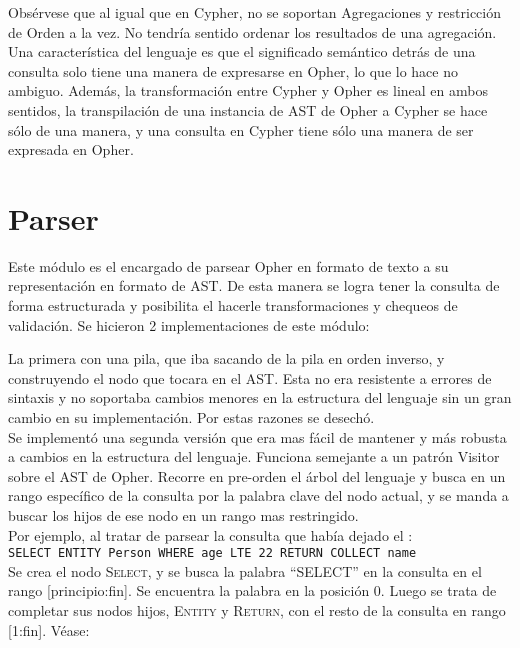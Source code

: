 Obs\'ervese que al igual que en Cypher, no se soportan Agregaciones y restricci\'on de Orden a la vez. No tendr\'ia sentido ordenar los resultados de una agregaci\'on.\\

Una caracter\'istica del lenguaje es que el significado sem\'antico detr\'as de una consulta solo tiene una manera de expresarse en Opher, lo que lo hace no ambiguo. Adem\'as, la transformaci\'on entre Cypher y Opher es lineal en ambos sentidos, la transpilaci\'on de una instancia de AST de Opher a Cypher se hace s\'olo de una manera, y una consulta en Cypher tiene s\'olo una manera de ser expresada en Opher.\\


\section{Parser}
\label{parser}
Este m\'odulo es el encargado de parsear Opher en formato de texto a su representaci\'on en formato de AST. De esta manera se logra tener la consulta de forma estructurada y posibilita el hacerle transformaciones y chequeos de validaci\'on. Se hicieron 2 implementaciones de este m\'odulo:

La primera con una pila, que iba sacando de la pila en orden inverso, y construyendo el nodo que tocara en el AST. Esta no era resistente a errores de sintaxis y no soportaba cambios menores en la estructura del lenguaje sin un gran cambio en su implementaci\'on. Por estas razones se desech\'o.\\

Se implement\'o una segunda versi\'on que era mas f\'acil de mantener y m\'as robusta a cambios en la estructura del lenguaje. Funciona semejante a un patr\'on Visitor sobre el AST de Opher. Recorre en pre-orden el \'arbol del lenguaje y busca en un rango espec\'ifico de la consulta por la palabra clave del nodo actual, y se manda a buscar los hijos de ese nodo en un rango mas restringido.\\

Por ejemplo, al tratar de parsear la consulta que hab\'ia dejado el :\\
\verb|SELECT ENTITY Person WHERE age LTE 22 RETURN COLLECT name|\\

Se crea el nodo \textsc{Select}, y se busca la palabra ``SELECT'' en la consulta en el rango [principio:fin]. Se encuentra la palabra en la posici\'on 0. Luego se trata de completar sus nodos hijos, \textsc{Entity} y \textsc{Return}, con el resto de la consulta en rango [1:fin]. V\'ease:\\


